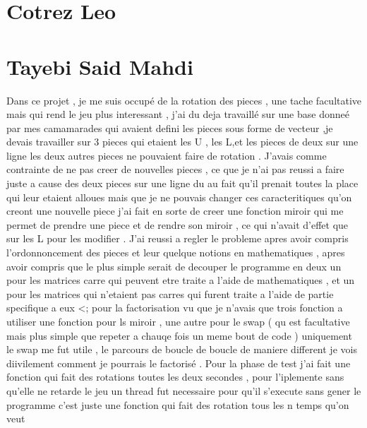 \documentclass[11pt]{article}
\begin{document}
\section{Cotrez Leo}


\section{Tayebi Said Mahdi}
Dans ce projet , je me suis occupé de la rotation des pieces , une tache facultative mais qui rend le jeu plus interessant , j'ai du deja travaillé sur une base donneé par mes camamarades qui avaient defini les pieces sous forme de vecteur ,je devais travailler sur 3 pieces qui etaient les U , les L,et les pieces de deux sur une ligne les deux autres pieces ne pouvaient faire de rotation . 
\newline J'avais comme contrainte de ne pas creer de nouvelles pieces , ce que je n'ai pas reussi a faire juste a cause des deux pieces sur une ligne du au fait qu'il prenait toutes la place qui leur etaient alloues mais que je ne pouvais changer ces caracteritiques qu'on creont une nouvelle piece 
  j'ai fait en sorte de creer une fonction miroir qui me permet de prendre une piece et de rendre son miroir , ce qui n'avait d'effet que sur les L pour les modifier .
J'ai reussi a regler le probleme apres avoir compris l'ordonnoncement des pieces et leur quelque notions en mathematiques , apres avoir compris que le plus simple serait de decouper le programme en deux un pour les matrices carre qui peuvent etre traite a l'aide de mathematiques , et un pour les matrices qui n'etaient pas carres qui furent traite a l'aide de partie specifique a eux <;
pour la factorisation  vu que je n'avais que trois fonction a utiliser une fonction pour ls miroir , une autre pour le swap ( qu est facultative mais plus simple que repeter a chauqe fois un meme bout de code ) uniquement le  swap me fut utile , le parcours de boucle de boucle de maniere different je vois diivilement comment je pourrais le factorisé .
 Pour la phase de test j'ai fait une fonction qui fait des rotations toutes les deux secondes , pour l'iplemente sans qu'elle ne retarde le jeu un thread fut necessaire pour qu'il s'execute sans gener le programme c'est juste une fonction qui fait des rotation tous les n temps qu'on veut
\end{document}
